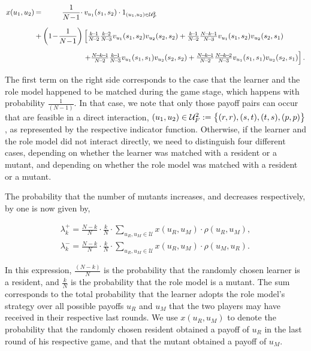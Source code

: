 \documentclass[11pt]{article}
\newcommand{\splitatcommas}[1]{%
  \begingroup
  \begingroup\lccode`~=`, \lowercase{\endgroup \edef~{\mathchar\the\mathcode`,
    \penalty0 \noexpand\hspace{0pt plus 1em}}%
  }\mathcode`,="8000 #1%
  \endgroup
}
\theoremstyle{plainCl1}
\theoremstyle{plainCl2}
\begin{document}
\begin{equation}\label{eq:Chi}
\setlength{\arraycolsep}{1pt}
\begin{array}{llrl}
x(u_1,u_2)	 &=&\displaystyle \frac{1}{N\!-\!1}\cdot  &v_{u_1}(s_1,s_2)\cdot 1_{(u_1,u_2)\in \mathcal{U}^2_F}\\[0.5cm]
&+	
&\displaystyle \left(1\!-\!\frac{1}{N\!-\!1}\right)  
&\left[ \frac{k\!-\!1}{N\!-\!2}\frac{k\!-\!2}{N\!-\!3} v_{u_1}(s_1,s_2) v_{u_2}(s_2,s_2) + 
 \frac{k\!-\!1}{N\!-\!2}\frac{N\!-\!k\!-\!1}{N\!-\!3} v_{u_1}(s_1,s_2) v_{u_2}(s_2,s_1)\right.\\[0.5cm]
&&&\left. +\frac{N\!-\!k\!-\!1}{N\!-\!2}\frac{k\!-\!1}{N\!-\!3} v_{u_1}(s_1,s_1) v_{u_2}(s_2,s_2) + 
 \frac{N\!-\!k\!-\!1}{N\!-\!2}\frac{N\!-\!k\!-\!2}{N\!-\!3} v_{u_1}(s_1,s_1) v_{u_2}(s_2,s_1)\right].
\end{array}
\end{equation}

The first term on the right side corresponds to the case that the learner and
the role model happened to be matched during the game stage, which happens with
probability $\frac{1}{(N\!-\!1)}$. In that case, we note that only those payoff
pairs can occur that are feasible in a direct interaction,
$\splitatcommas{(u_1,u_2)\in \mathcal{U}^2_F:=\big\{ (r, r), (s, t), (t, s), (p,
p) \big\}}$, as represented by the respective indicator function. Otherwise, if
the learner and the role model did not interact directly, we need to distinguish
four different cases, depending on whether the learner was matched with a
resident or a mutant, and depending on whether the role model was matched with a
resident or a mutant.

The probability that the number of mutants increases, and decreases respectively,
by one is now given by,

\begin{align}
\lambda^+_k=\frac{N\!-\!k}{N}\cdot \frac{k}{N}\cdot \sum_{u_{R},u_{M}\in\mathcal{U}} x(u_{R},u_{M})\cdot \rho(u_{R},u_{M}), \\
\lambda^-_k=\frac{N\!-\!k}{N}\cdot \frac{k}{N}\cdot \sum_{u_{R},u_{M}\in\mathcal{U}} x(u_{R},u_{M})\cdot \rho(u_{M},u_{R}).
\end{align}

In this expression, $\frac{(N\!-\!k)}{N}$ is the probability that the randomly
chosen learner is a resident, and $\frac{k}{N}$ is the probability that the role
model is a mutant. The sum corresponds to the total probability that the learner
adopts the role model's strategy over all possible payoffs $u_R$ and $u_M$ that
the two players may have received in their respective last rounds. We use
$x(u_R,u_M)$ to denote the probability that the randomly chosen resident
obtained a payoff of $u_R$ in the last round of his respective game, and that
the mutant obtained a payoff of $u_M$.
\end{document}
